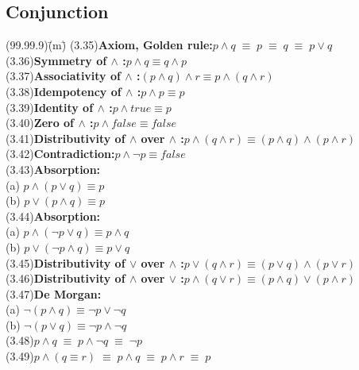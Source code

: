 \documentclass[12pt, fleqn, leqno]{article}
\newcommand{\lgap}{2pt}                             %
\newcommand{\equivs}{\ensuremath{\;\equiv\;}}       %
\begin{document}
\subsection*{Conjunction}
\begin{tabbing}
(99.99.9)\;\=(m)\;\=\kill
(3.35)\>\textbf{Axiom, Golden rule:}\quad $p\land q\equivs p\equivs q\equivs p\lor q$\\[\lgap]
(3.36)\>\textbf{Symmetry of $\land$ :}\quad $p\land q \equiv q\land p$\\[\lgap]
(3.37)\>\textbf{Associativity of $\land$ :}\quad $(p\land q) \land r\equiv p\land (q\land r)$\\[\lgap]
(3.38)\>\textbf{Idempotency of $\land$ :}\quad  $p\land p \equiv p$\\[\lgap]
(3.39)\>\textbf{Identity of $\land$ :}\quad $p\land true\equiv p$\\[\lgap]
(3.40)\>\textbf{Zero of $\land$ :}\quad $p\land false\equiv false$\\[\lgap]
(3.41)\>\textbf{Distributivity of $\land$ over $\land$ :}\quad $p\land (q\land r)\equiv (p\land q)\land (p\land r)$\\[\lgap]
(3.42)\>\textbf{Contradiction:}\quad $p \land \neg p \equiv false$\\[\lgap]
(3.43)\>\textbf{Absorption:}\\
      \> (a)\> $p \land (p \lor q) \equiv p$\\[\lgap]
      \> (b)\> $p \lor (p \land q) \equiv p$\\[\lgap]
(3.44)\>\textbf{Absorption:}\\
      \> (a)\> $p \land (\neg p \lor q) \equiv p \land q$\\[\lgap]
      \> (b)\> $p \lor (\neg p \land q) \equiv p \lor q$\\[\lgap]
(3.45)\>\textbf{Distributivity of $\lor$ over $\land$ :}\quad $p\lor (q\land r)\equiv (p\lor q)\land (p\lor r)$\\[\lgap]
(3.46)\>\textbf{Distributivity of $\land$ over $\lor$ :}\quad $p\land (q\lor r)\equiv (p\land q)\lor (p\land r)$\\[\lgap]
(3.47)\>\textbf{De Morgan:}\\
      \> (a)\> $\neg (p \land q) \equiv \neg p \lor \neg q$\\[\lgap]
      \> (b)\> $\neg (p \lor q) \equiv \neg p \land \neg q$\\[\lgap]
(3.48)\>$p\land q\equivs p\land \neg q\equivs \neg p$\\[\lgap]
(3.49)\>$p\land (q\equiv r)\equivs p\land q\equivs p\land r \equivs p$\\[\lgap]

\end{tabbing}
\end{document}
